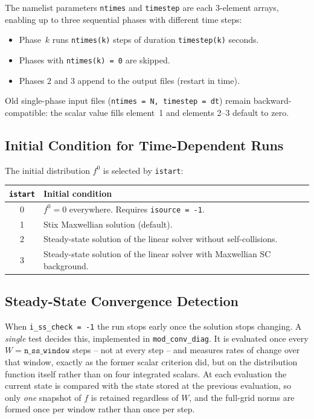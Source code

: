 \documentclass[11pt,a4paper]{article}
\begin{document}
The namelist parameters \texttt{ntimes} and \texttt{timestep} are each
3-element arrays, enabling up to three sequential phases with different time
steps:
\begin{itemize}
  \item Phase~$k$ runs \texttt{ntimes(k)} steps of duration \texttt{timestep(k)} seconds.
  \item Phases with \texttt{ntimes(k) = 0} are skipped.
  \item Phases 2 and 3 append to the output files (restart in time).
\end{itemize}
Old single-phase input files (\texttt{ntimes = N, timestep = dt}) remain
backward-compatible: the scalar value fills element~1 and elements 2--3
default to zero.

\subsection{Initial Condition for Time-Dependent Runs}

The initial distribution $f^0$ is selected by \texttt{istart}:

\begin{center}
\begin{tabular}{cl}
\toprule
\texttt{istart} & Initial condition \\
\midrule
0 & $f^0 = 0$ everywhere. Requires \texttt{isource = -1}. \\
1 & Stix Maxwellian solution (default). \\
2 & Steady-state solution of the linear solver without self-collisions. \\
3 & Steady-state solution of the linear solver with Maxwellian SC background. \\
\bottomrule
\end{tabular}
\end{center}

\subsection{Steady-State Convergence Detection}
\label{sec:ssconv}

When \texttt{i\_ss\_check = -1} the run stops early once the solution stops
changing.  A \emph{single} test decides this, implemented in
\texttt{mod\_conv\_diag}.  It is evaluated once every $W =
\texttt{n\_ss\_window}$ steps -- not at every step -- and measures rates of
change over that window, exactly as the former scalar criterion did, but on the
distribution function itself rather than on four integrated scalars.  At each
evaluation the current state is compared with the state stored at the previous
evaluation, so only \emph{one} snapshot of $f$ is retained regardless of $W$,
and the full-grid norms are formed once per window rather than once per step.
\end{document}
